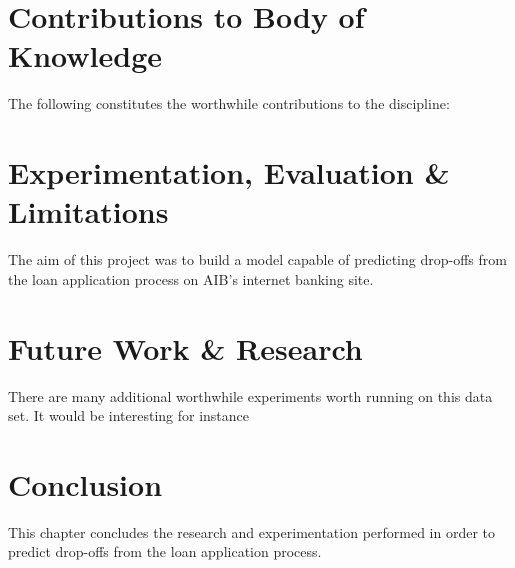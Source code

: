\section{Contributions to Body of Knowledge}
The following constitutes the worthwhile contributions to the discipline:


\section{Experimentation, Evaluation \& Limitations}
The aim of this project was to build a model capable of predicting drop-offs from the loan application process on AIB's internet banking site.


\section{Future Work \& Research}
There are many additional worthwhile experiments worth running on this data set. It would be interesting for instance



\section{Conclusion}
This chapter concludes the research and experimentation performed in order to predict drop-offs from the loan application process. 

